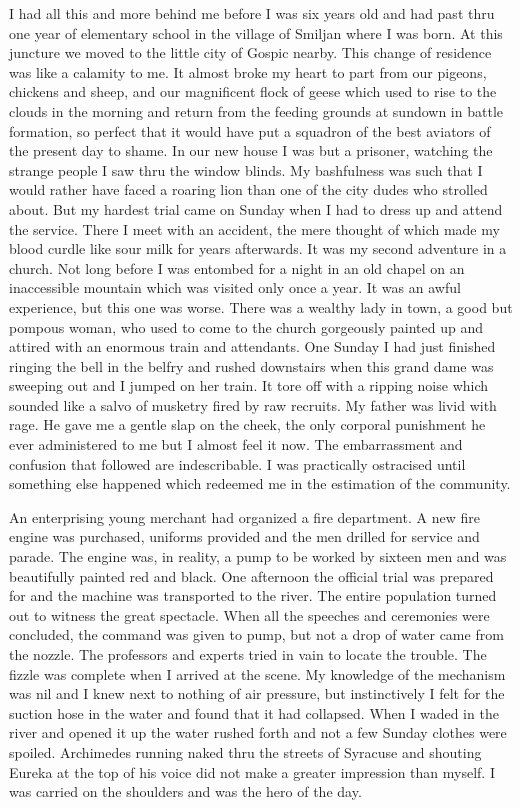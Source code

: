 \documentclass[a4paper,12pt,english,twoside,openright]{memoir}
\begin{document}
	
	I had all this and more behind me before I was six years old and had past thru one year of 
	elementary school in the village of Smiljan where I was born.  At this juncture we moved to the 
	little city of Gospic nearby.  This change of residence was like a calamity to me.  It almost broke 
	my heart to part from our pigeons, chickens and sheep, and our magnificent flock of geese which 
	used to rise to the clouds in the morning and return from the feeding grounds at sundown in battle 
	formation, so perfect that it would have put a squadron of the best aviators of the present day to 
	shame.  In our new house I was but a prisoner, watching the strange people I saw thru the 
	window blinds.  My bashfulness was such that I would rather have faced a roaring lion than one 
	of the city dudes who strolled about.  But my hardest trial came on Sunday when I had to dress 
	up and attend the service.  There I meet with an accident, the mere thought of which made my 
	blood curdle like sour milk for years afterwards.  It was my second adventure in a church.  Not 
	long before I was entombed for a night in an old chapel on an inaccessible mountain which was 
	visited only once a year.  It was an awful experience, but this one was worse.  There was a 
	wealthy lady in town, a good but pompous woman, who used to come to the church gorgeously 
	painted up and attired with an enormous train and attendants.  One Sunday I had just finished 
	ringing the bell in the belfry and rushed downstairs when this grand dame was sweeping out and I 
	jumped on her train.  It tore off with a ripping noise which sounded like a salvo of musketry fired 
	by raw recruits.  My father was livid with rage.  He gave me a gentle slap on the cheek, the only 
	corporal punishment he ever administered to me but I almost feel it now.  The embarrassment 
	and confusion that followed are indescribable.  I was practically ostracised until something else 
	happened which redeemed me in the estimation of the community.  
	
	An enterprising young merchant had organized a fire department.  A new fire engine was 
	purchased, uniforms provided and the men drilled for service and parade.  The engine was, in 
	reality, a pump to be worked by sixteen men and was beautifully painted red and black.  One 
	afternoon the official trial was prepared for and the machine was transported to the river.  The 
	entire population turned out to witness the great spectacle.  When all the speeches and 
	ceremonies were concluded, the command was given to pump, but not a drop of water came 
	from the nozzle.  The professors and experts tried in vain to locate the trouble.  The fizzle was 
	complete when I arrived at the scene.  My knowledge of the mechanism was nil and I knew next 
	to nothing of air pressure, but instinctively I felt for the suction hose in the water and found that it 
	had collapsed.  When I waded in the river and opened it up the water rushed forth and not a few 
	Sunday clothes were spoiled.  Archimedes running naked thru the streets of Syracuse and 
	shouting Eureka at the top of his voice did not make a greater impression than myself.  I was 
	carried on the shoulders and was the hero of the day.  
	
\end{document}
